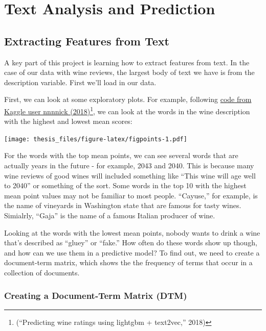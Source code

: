 \documentclass[12pt,twoside]{amherstthesis}
\begin{document}
\chapter{Text Analysis and Prediction}\label{math-sci}

\section{Extracting Features from
Text}\label{extracting-features-from-text}

A key part of this project is learning how to extract features from
text. In the case of our data with wine reviews, the largest body of
text we have is from the description variable. First we'll load in our
data.

First, we can look at some exploratory plots. For example, following
\href{https://www.kaggle.com/nnnnick/predicting-wine-ratings-using-lightgbm-text2vec}{code
from Kaggle user nnnnick (2018)}\footnote{(``Predicting wine ratings
  using lightgbm + text2vec,'' 2018)}, we can look at the words in the
wine description with the highest and lowest mean scores:

\texttt{[image: thesis\_files/figure-latex/figpoints-1.pdf]}

For the words with the top mean points, we can see several words that
are actually years in the future - for example, 2043 and 2040. This is
because many wine reviews of good wines will included something like
``This wine will age well to 2040'' or something of the sort. Some words
in the top 10 with the highest mean point values may not be familiar to
most people. ``Cayuse,'' for example, is the name of vineyards in
Washington state that are famous for tasty wines. Simialrly, ``Gaja'' is
the name of a famous Italian producer of wine.

Looking at the words with the lowest mean points, nobody wants to drink
a wine that's described as ``gluey'' or ``fake.'' How often do these
words show up though, and how can we use them in a predictive model? To
find out, we need to create a document-term matrix, which shows the the
frequency of terms that occur in a collection of documents.

\subsection{Creating a Document-Term Matrix
(DTM)}\label{creating-a-document-term-matrix-dtm}
\end{document}
